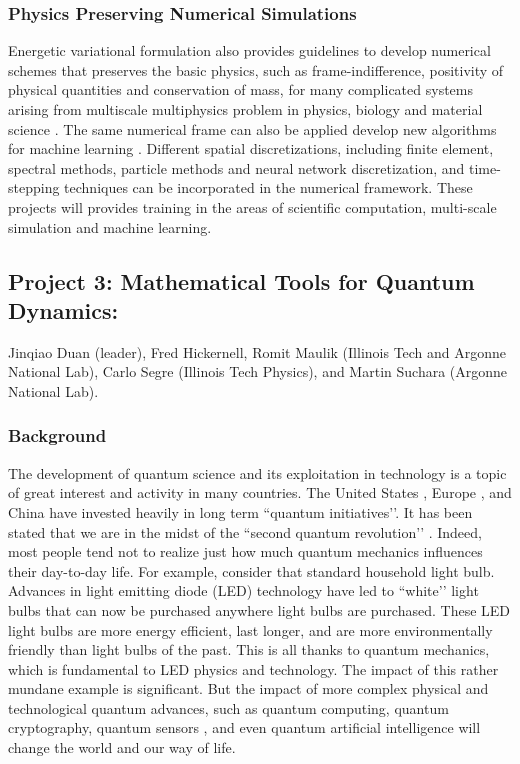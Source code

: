 \documentclass[11pt]{NSFamsart}
\begin{document}
\subsubsection*{Physics Preserving Numerical Simulations}
Energetic variational formulation also provides guidelines to develop numerical schemes that preserves the basic physics, such as frame-indifference, positivity of physical quantities  and conservation of mass, for many complicated systems arising from multiscale multiphysics problem in physics, biology and material science \cite{liu2020variational, liu2020lagrangian, liu2020structure}. The same numerical frame can also be applied develop new algorithms for machine learning \cite{wang2020particle}. Different spatial discretizations, including finite element, spectral methods, particle methods and neural network discretization, and time-stepping techniques can be incorporated in the numerical framework. These projects will provides training in the areas of scientific computation, multi-scale simulation and machine learning.



\subsection*{Project 3: Mathematical Tools for Quantum Dynamics:}
Jinqiao Duan (leader), Fred Hickernell, Romit Maulik (Illinois Tech and Argonne National Lab), Carlo Segre (Illinois Tech Physics), and Martin Suchara (Argonne National Lab).

\subsubsection*{Background} The development of quantum science and its exploitation in technology is a topic of great interest and activity in many countries. The United States \cite{raymer2019us}, Europe \cite{riedel2019europe}, and China \cite{kania2018quantum} have invested heavily in long term ``quantum initiatives’’.  It has been stated that we are in the midst of the ``second quantum revolution’’ \cite{kania2018quantum}. Indeed,  most people tend not to realize just how much quantum mechanics influences their day-to-day life. For example, consider that standard household light bulb. Advances in light emitting diode (LED) technology have led to ``white’’ light bulbs that can now be purchased anywhere light bulbs are purchased. These LED light bulbs are more energy efficient, last longer, and are more environmentally friendly than light bulbs of the past. This is all thanks to quantum mechanics, which is fundamental to LED physics and technology. The impact of this rather mundane example is significant. But the impact of more complex physical and technological quantum advances, such as quantum computing, quantum cryptography, quantum sensors \cite{ng2020guest}, and even quantum artificial intelligence \cite{taylor2020quantum} will change the world and our way of life.
\end{document}
